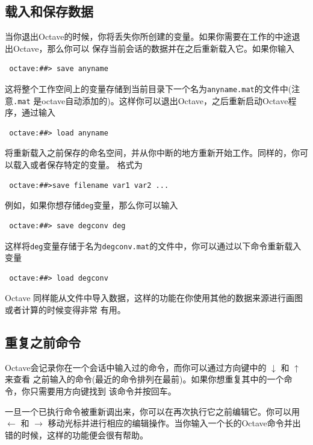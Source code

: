 \documentclass[UTF8,adobefonts]{ctexart}
\begin{document}
\subsection{载入和保存数据}
当你退出Octave的时候，你将丢失你所创建的变量。如果你需要在工作的中途退出Octave，那么你可以
保存当前会话的数据并在之后重新载入它。如果你输入
\begin{verbatim}
 octave:##> save anyname
\end{verbatim}
这将整个工作空间上的变量存储到当前目录下一个名为{\tt anyname.mat}的文件中(注意{\tt .mat}
是octave自动添加的)。这样你可以退出Octave，之后重新启动Octave程序，通过输入
\begin{verbatim}
 octave:##> load anyname
\end{verbatim}
将重新载入之前保存的命名空间，并从你中断的地方重新开始工作。同样的，你可以载入或者保存特定的变量。
格式为
\begin{verbatim}
 octave:##>save filename var1 var2 ...
\end{verbatim}
例如，如果你想存储{\tt deg}变量，那么你可以输入
\begin{verbatim}
 octave:##> save degconv deg
\end{verbatim}
这样将{\tt deg}变量存储于名为{\tt degconv.mat}的文件中，你可以通过以下命令重新载入变量
\begin{verbatim}
 octave:##> load degconv
\end{verbatim}
Octave 同样能从文件中导入数据，这样的功能在你使用其他的数据来源进行画图或者计算的时候变得非常
有用。
\subsection{重复之前命令}
Octave会记录你在一个会话中输入过的命令，而你可以通过方向键中的 $\downarrow$ 和 $\uparrow$ 来查看
之前输入的命令(最近的命令排列在最前)。如果你想重复其中的一个命令，你只需要用方向键找到
该命令并按回车。

一旦一个已执行命令被重新调出来，你可以在再次执行它之前编辑它。你可以用$\leftarrow$ 和 $\rightarrow$
移动光标并进行相应的编辑操作。当你输入一个长的Octave命令并出错的时候，这样的功能便会很有帮助。
\end{document}

